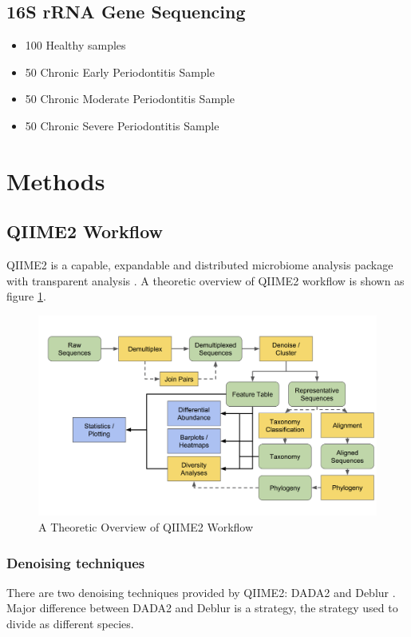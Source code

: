 \documentclass[a4paper]{article}
\begin{document}
        \subsection{16S rRNA Gene Sequencing}

            \begin{itemize}
                \item 100 Healthy samples
                \item 50 Chronic Early Periodontitis Sample
                \item 50 Chronic Moderate Periodontitis Sample
                \item 50 Chronic Severe Periodontitis Sample
            \end{itemize}

    \section{Methods}
        \subsection{QIIME2 Workflow}
            QIIME2 is a capable, expandable and distributed microbiome analysis package with transparent analysis \cite{qiime1, qiime2}. A theoretic overview of QIIME2 workflow is shown as figure \ref{fig:qiime-workflow}.

            \begin{figure}[p]
                \centering
                \includegraphics[width=0.8 \linewidth]{figures/qiime.png}
                \caption{A Theoretic Overview of QIIME2 Workflow \protect\cite{qiime1, qiime2}}
                \label{fig:qiime-workflow}
            \end{figure}

            \subsubsection{Denoising techniques}
                There are two denoising techniques provided by QIIME2: DADA2 \cite{DADA1} and Deblur \cite{deblur1}. Major difference between DADA2 and Deblur is a strategy, the strategy used to divide as different species.
\end{document}
